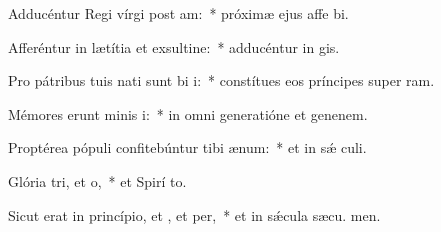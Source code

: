 \item Adducéntur Regi vírgi post am:~* próximæ ejus affe bi.
\item Afferéntur in lætítia et exsultine:~* adducéntur in  gis.
\item Pro pátribus tuis nati sunt bi i:~* constítues eos príncipes super  ram.
\item Mémores erunt minis i:~* in omni generatióne et genenem.
\item Proptérea pópuli confitebúntur tibi  ænum:~* et in sǽ culi.
\item Glória tri, et o,~* et Spirí to.
\item Sicut erat in princípio, et , et per,~* et in sǽcula sæcu. men.
